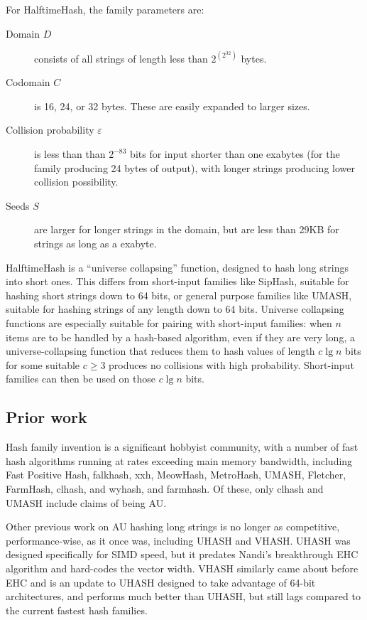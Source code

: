 \documentclass[sigconf, nonacm]{acmart}
\begin{document}
For HalftimeHash, the family parameters are:

\begin{description}
\item[Domain $D$] consists of all strings of length less than $2^{\left(2^{32}\right)}$ bytes.
\item[Codomain $C$] is 16, 24, or 32 bytes.
  These are easily expanded to larger sizes.
\item[Collision probability $\varepsilon$] is less than than $2^{-83}$ bits for input shorter than one exabytes (for the family producing 24 bytes of output), with longer strings producing lower collision possibility.
\item[Seeds $S$] are larger for longer strings in the domain, but are less than 29KB for strings as long as a exabyte.
\end{description}

HalftimeHash is a ``universe collapsing'' function, designed to hash long strings into short ones. \cite{linear-hash-functions,hashing-without-primes-revisited,cuckoo-journal}
This differs from short-input families like SipHash, suitable for hashing short strings down to 64 bits, or general purpose families like UMASH, suitable for hashing strings of any length down to 64 bits.
Universe collapsing functions are especially suitable for pairing with short-input families: when $n$ items are to be handled by a hash-based algorithm, even if they are very long, a universe-collapsing function that reduces them to hash values of length $c \lg n$ bits for some suitable $c \geq 3$ produces no collisions with high probability.
Short-input families can then be used on those $c \lg n$ bits. \cite{universe-collapse-linear-probing,siphash,tabulation,simple-hash-functions-work}

\subsection{Prior work}

Hash family invention is a significant hobbyist community, with a number of fast hash algorithms running at rates exceeding main memory bandwidth, including Fast Positive Hash, falk\-hash, xxh, Meow\-Hash, Metro\-Hash, U\-MASH, Fletcher, Farm\-Hash, cl\-hash, and wy\-hash, and farm\-hash. \cite{i7-7800x,smhasher}
Of these, only cl\-hash and U\-MASH include claims of being AU.

Other previous work on AU hashing long strings is no longer as competitive, performance-wise, as it once was, including UHASH and VHASH.
UHASH was designed specifically for SIMD speed, but it predates Nandi's breakthrough EHC algorithm and hard-codes the vector width. \cite{umac}
VHASH similarly came about before EHC and is an update to UHASH designed to take advantage of 64-bit architectures, and performs much better than UHASH, but still lags compared to the current fastest hash families. \cite{vmac,smhasher}
\end{document}
